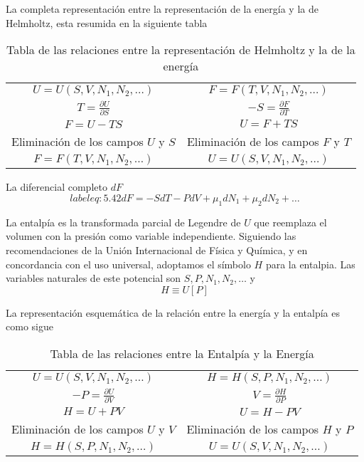 \documentclass{report}
\begin{document}
La completa representación entre la representación de la energía y la de Helmholtz, esta resumida en la siguiente tabla
\begin{table}[h]
  \centering
  \caption{Tabla de  las relaciones entre la representación de Helmholtz y la de la energía}
  \label{table:Helmholtz}
  \begin{tabular}{c|c}
    \hline
    $U=U(S,V,N_1,N_2,\ldots)$ & $F=F(T,V,N_1,N_2,\ldots)$ \\
    $T=\frac{\partial U}{\partial S}$ & $-S=\frac{\partial F}{\partial T}$ \\
    $F=U-TS$ & $U=F+TS$ \\
    Eliminación de los campos $U$ y $S$ & Eliminación de los campos $F$ y $T$ \\
    $F=F(T,V,N_1,N_2,\ldots)$ & $U=U(S,V,N_1,N_2,\ldots)$ \\
    \hline
  \end{tabular}
\end{table}

La diferencial completo $dF$
\begin{equation}
  label{eq:5.42}
dF = -SdT - PdV + \mu_1 dN_1 + \mu_2 dN_2 + \ldots
\end{equation}

La entalpía es la transformada parcial de Legendre de $U$ que reemplaza el volumen con la presión como variable independiente. Siguiendo las recomendaciones de la Unión Internacional de Física y Química, y en concordancia con el uso universal, adoptamos el símbolo $H$ para la entalpia. Las variables naturales de este potencial son $S,P,N_1,N_2,\ldots$ y 
\begin{equation}
  H\equiv U\left[ P \right]
\end{equation}

La representación esquemática de la relación entre la energía y la entalpía es como sigue
\begin{table}[h]
  \centering
  \label{table:Entalpia}
  \caption{Tabla de las relaciones entre la Entalpía y la Energía}
  \begin{tabular}{c|c}
    \hline
    $U=U(S,V,N_1,N_2,\ldots)$ & $H=H(S,P,N_1,N_2,\ldots)$ \\
    $-P = \frac{\partial U}{\partial V}$ & $V=\frac{\partial H}{\partial P}$ \\
    $H = U + PV$ & $U=H-PV$ \\
    Eliminación de los campos $U$ y $V$ & Eliminación de los campos $H$ y $P$ \\
    $H = H(S,P,N_1,N_2,\ldots)$ & $U=U(S,V,N_1,N_2,\ldots)$\\
    \hline
  \end{tabular}
\end{table}
\end{document}
